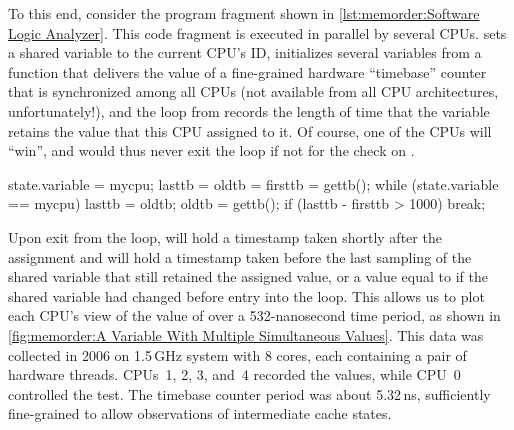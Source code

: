 \begin{fcvref}
To this end, consider the program fragment shown in
\cref{lst:memorder:Software Logic Analyzer}.
This code fragment is executed in parallel by several CPUs.
 sets a shared variable to the current CPU's ID, 
initializes several variables from a  function that
delivers the value of a fine-grained hardware ``timebase'' counter that is
synchronized among all CPUs (not available from all CPU architectures,
unfortunately!), and the loop from 
records the length of
time that the variable retains the value that this CPU assigned to it.
Of course, one of the CPUs will ``win'', and would thus never exit
the loop if not for the check on .
\end{fcvref}

\QuickQuizEnd

\begin{listing}
\begin{fcvlabel}
\begin{VerbatimL}[commandchars=\\\[\]]
state.variable = mycpu;			\lnlbl[setid]
lasttb = oldtb = firsttb = gettb();	\lnlbl[init]
while (state.variable == mycpu) {	\lnlbl[loop:b]
	lasttb = oldtb;
	oldtb = gettb();
	if (lasttb - firsttb > 1000)	\lnlbl[iftmout]
		break;			\lnlbl[break]
}					\lnlbl[loop:e]
\end{VerbatimL}
\end{fcvlabel}
\caption{Software Logic Analyzer}
\label{lst:memorder:Software Logic Analyzer}
\end{listing}

Upon exit from the loop,  will hold a timestamp
taken shortly after the assignment and  will hold
a timestamp taken before the last sampling of the shared variable
that still retained the assigned value, or a value equal to 
if the shared variable had changed before entry into the loop.
This allows us to plot each CPU's view of the value of 
over a 532-nanosecond time period, as shown in
\cref{fig:memorder:A Variable With Multiple Simultaneous Values}.
This data was collected in 2006 on 1.5\,GHz  system with 8 cores,
each containing a pair of hardware threads.
CPUs~1, 2, 3, and~4 recorded the values, while CPU~0 controlled the test.
The timebase counter period was about 5.32\,ns, sufficiently fine-grained
to allow observations of intermediate cache states.

